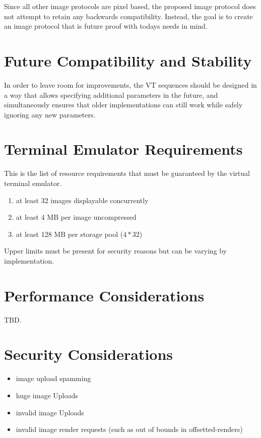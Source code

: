 \documentclass{article}
\begin{document}
Since all other image protocols are pixel based, the proposed image protocol does not
attempt to retain any backwards compatibility. Instead, the goal is to create
an image protocol that is future proof with todays needs in mind.

\section{Future Compatibility and Stability} %

In order to leave room for improvements, the VT sequences should be designed in a way
that allows specifying additional parameters in the future, and simultaneously ensures
that older implementations can still work while safely ignoring any new parameters.

\section{Terminal Emulator Requirements} %

This is the list of resource requirements that must be guaranteed by the virtual terminal emulator.

\begin{enumerate}
    \item at least 32 images displayable concurrently
    \item at least 4 MB per image uncompressed
    \item at least 128 MB per storage pool (\(4 * 32\))
\end{enumerate}

Upper limits must be present for security reasons but can be varying by implementation.


\section{Performance Considerations} %

TBD.

\section{Security Considerations} %

\begin{itemize}
    \item image upload spamming
    \item huge image Uploads
    \item invalid image Uploads
    \item invalid image render requests (such as out of bounds in offsetted-renders)
\end{itemize}
\end{document}
